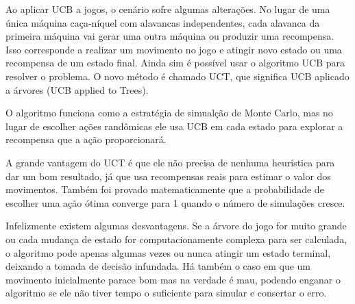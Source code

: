 Ao aplicar UCB a jogos, o cenário sofre algumas alterações. No lugar de uma única máquina caça-níquel com alavancas independentes, cada alavanca da primeira máquina vai gerar uma outra máquina ou produzir uma recompensa. Isso corresponde a realizar um movimento no jogo e atingir novo estado ou uma recompensa de um estado final. Ainda sim é possível usar o algoritmo UCB para resolver o problema. O novo método é chamado UCT\cite{uct}, que significa UCB aplicado a árvores (UCB applied to Trees). 

O algoritmo funciona como a estratégia de simualção de Monte Carlo, mas no lugar de escolher ações randômicas ele usa UCB em cada estado para explorar a recompensa que a ação proporcionará. 

A grande vantagem do UCT é que ele não precisa de nenhuma heurística para dar um bom resultado, já que usa recompensas reais para estimar o valor dos movimentos. Também foi provado matematicamente que a probabilidade de escolher uma ação ótima converge para 1 quando o número de simulações cresce. 

Infelizmente existem algumas desvantagens. Se a árvore do jogo for muito grande ou cada mudança de estado for computacionamente complexa para ser calculada, o algoritmo pode apenas algumas vezes ou nunca atingir um estado terminal, deixando a tomada de decisão infundada. Há também o caso em que um movimento inicialmente parace bom mas na verdade é mau, podendo enganar o algoritmo se ele não tiver tempo o suficiente para simular e consertar o erro. 